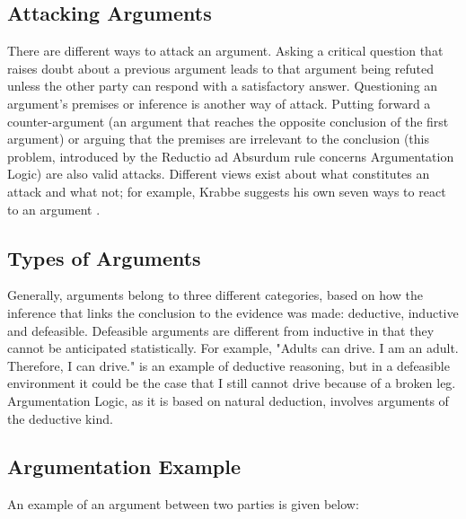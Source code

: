 \documentclass[11pt,twoside,a4paper]{report}
\begin{document}
\subsection{Attacking Arguments}
There are different ways to attack an argument. Asking a critical question that raises doubt about a previous argument leads to that argument being refuted unless the other party can respond with a satisfactory answer. Questioning an argument's premises or inference is another way of attack. Putting forward a counter-argument (an argument that reaches the opposite conclusion of the first argument) or arguing that the premises are irrelevant to the conclusion (this problem, introduced by the Reductio ad Absurdum rule concerns Argumentation Logic) are also valid attacks. Different views exist about what constitutes an attack and what not; for example, Krabbe suggests his own seven ways to react to an argument \citep*{reasonreclaimed}.

\subsection{Types of Arguments}
Generally, arguments belong to three different categories, based on how the inference that links the conclusion to the evidence was made: deductive, inductive and defeasible. Defeasible arguments are different from inductive in that they cannot be anticipated statistically. For example, "Adults can drive. I am an adult. Therefore, I can drive." is an example of deductive reasoning, but in a defeasible environment it could be the case that I still cannot drive because of a broken leg. Argumentation Logic, as it is based on natural deduction, involves arguments of the deductive kind.

\subsection{Argumentation Example}
An example of an argument between two parties is given below:
\end{document}
